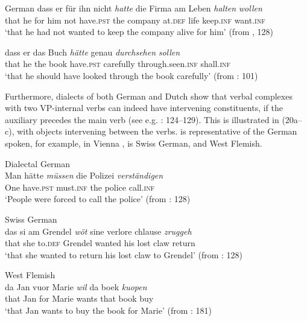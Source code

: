 \documentclass[output=paper, colorlinks, citecolor=brown]{langscibook}
\begin{document}
\ea German
\label{ex:sangfelt:19}
\ea\label{ex:sangfelt:19a}
\gll dass er für ihn nicht \textit{hatte} {die} {Firma} am Leben \textit{halten} \textit{wollen} \\
 that he for him not have.\textsc{pst} the company at.\textsc{def} life keep.\textsc{inf} want.\textsc{inf} \\
\glt ‘that he had not wanted to keep the company alive for him’ (from \citealt{Haider2013}, 128)

\ex\label{ex:sangfelt:19b}
\gll dass er das Buch \textit{hätte} {genau} \textit{durchsehen} \textit{sollen}\\
 that he the book have.\textsc{pst} carefully through.seen.\textsc{inf} shall.\textsc{inf} \\
\glt ‘that he should have looked through the book carefully’ (from \citealt{Sheehan2017Final}: 101)
\z 
\z

Furthermore, dialects of both German and Dutch show that verbal complexes with two VP-internal verbs can indeed have intervening constituents, if the auxiliary precedes the main verb (see e.g. \citealt{Sapp2011}: 124–129). This is illustrated in (20a–c), with objects intervening between the verbs.  is representative of the German spoken, for example, in Vienna \citep[128]{Haider2013},  is Swiss German, and  West Flemish.


\ea 
\label{ex:sangfelt:20}
\ea Dialectal German\label{ex:sangfelt:20a}\\
\gll Man hätte \textit{müssen} {die} {Polizei} \textit{verständigen} \\
 One have.\textsc{pst} must.\textsc{inf} the police call.\textsc{inf} \\
\glt ‘People were forced to call the police’ (from \citealt{Haider2013}: 128)

\ex Swiss German\label{ex:sangfelt:20b}\\
\gll das si am Grendel \textit{wöt} {sine} {verlore} {chlause} \textit{zruggeh}\\
 that she to.\textsc{def} Grendel wanted his lost claw return \\
\glt ‘that she wanted to return his lost claw to Grendel’ (from \citealt{Haider2013}: 128)

\ex West Flemish\label{ex:sangfelt:20c}\\
\gll da Jan vuor Marie \textit{wil} {da} {boek} \textit{kuopen} \\
 that Jan for Marie wants that book buy \\
\glt ‘that Jan wants to buy the book for Marie’ (from \citealt{Haegeman1992}: 181)\\
\z
\z
\end{document}
